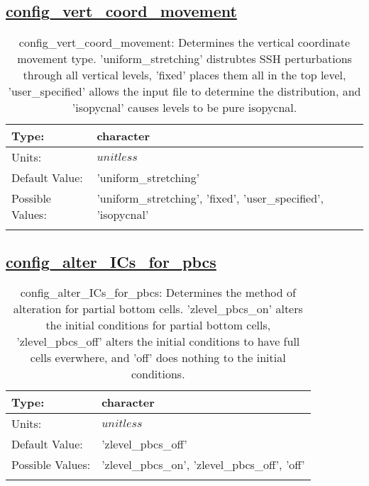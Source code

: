 \subsection[config\_vert\_coord\_movement]{\hyperref[sec:nm_tab_grid]{config\_vert\_coord\_movement}}
\label{subsec:nm_sec_config_vert_coord_movement}
\begin{center}
\begin{longtable}{| p{2.0in} | p{4.0in} |}
    \hline
    Type: & character \\
    \hline
    Units: & $unitless$ \\
    \hline
    Default Value: & 'uniform\_stretching' \\
    \hline
    Possible Values: & 'uniform\_stretching', 'fixed', 'user\_specified', 'isopycnal' \\
    \hline
    \caption{config\_vert\_coord\_movement: Determines the vertical coordinate movement type. 'uniform\_stretching' distrubtes SSH perturbations through all vertical levels, 'fixed' places them all in the top level, 'user\_specified' allows the input file to determine the distribution, and 'isopycnal' causes levels to be pure isopycnal.}
\end{longtable}
\end{center}
\subsection[config\_alter\_ICs\_for\_pbcs]{\hyperref[sec:nm_tab_grid]{config\_alter\_ICs\_for\_pbcs}}
\label{subsec:nm_sec_config_alter_ICs_for_pbcs}
\begin{center}
\begin{longtable}{| p{2.0in} | p{4.0in} |}
    \hline
    Type: & character \\
    \hline
    Units: & $unitless$ \\
    \hline
    Default Value: & 'zlevel\_pbcs\_off' \\
    \hline
    Possible Values: & 'zlevel\_pbcs\_on', 'zlevel\_pbcs\_off', 'off' \\
    \hline
    \caption{config\_alter\_ICs\_for\_pbcs: Determines the method of alteration for partial bottom cells. 'zlevel\_pbcs\_on' alters the initial conditions for partial bottom cells, 'zlevel\_pbcs\_off' alters the initial conditions to have full cells everwhere, and 'off' does nothing to the initial conditions.}
\end{longtable}
\end{center}
